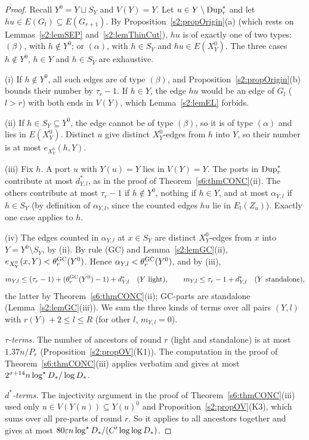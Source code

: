 \begin{proof}
Recall $Y^0=Y\sqcup S_Y$ and $V(Y)=Y$. Let $u\in Y\setminus\mathrm{Dup}^{*}_r$ and let $hu\in E(G_l)\subseteq E(G_{r+1})$. By Proposition~\ref{s2:propOrigin}(a) (which rests on Lemmas~\ref{s2:lemSEP} and~\ref{s2:lemThinCut}), $hu$ is of exactly one of two types: $(\beta)$, with $h\notin Y^0$; or $(\alpha)$, with $h\in S_Y$ and $hu\in E(X^0_Y)$. The three cases $h\notin Y^0$, $h\in Y$ and $h\in S_Y$ are exhaustive.

(i) If $h\notin Y^0$, all such edges are of type $(\beta)$, and Proposition~\ref{s2:propOrigin}(b) bounds their number by $\tau_r-1$. If $h\in Y$, the edge $hu$ would be an edge of $G_l$ ($l>r$) with both ends in $V(Y)$, which Lemma~\ref{s2:lemEL} forbids.

(ii) If $h\in S_Y\subseteq Y^0$, the edge cannot be of type $(\beta)$, so it is of type $(\alpha)$ and lies in $E(X^0_Y)$. Distinct $u$ give distinct $X^0_Y$-edges from $h$ into $Y$, so their number is at most $e_{X^0_Y}(h,Y)$.

(iii) Fix $h$. A port $u$ with $Y(u)=Y$ lies in $V(Y)=Y$. The ports in $\mathrm{Dup}^{*}_r$ contribute at most $d^*_{Y,l}$, as in the proof of Theorem~\ref{s6:thmCONC}(ii). The others contribute at most $\tau_r-1$ if $h\notin Y^0$, nothing if $h\in Y$, and at most $\alpha_{Y,l}$ if $h\in S_Y$ (by definition of $\alpha_{Y,l}$, since the counted edges $hu$ lie in $E_l(Z_u)$). Exactly one case applies to $h$.

(iv) The edges counted in $\alpha_{Y,l}$ at $x\in S_Y$ are distinct $X^0_Y$-edges from $x$ into $Y=Y^0\setminus S_Y$, by (ii). By rule (GC) and Lemma~\ref{s2:lemGC}(ii), $e_{X^0_Y}(x,Y)<\theta^{\mathrm{GC}}_r(Y^0)$. Hence $\alpha_{Y,l}<\theta^{\mathrm{GC}}_r(Y^0)$, and by (iii),
\[
m_{Y,l}\le(\tau_r-1)+(\theta^{\mathrm{GC}}_r(Y^0)-1)+d^*_{Y,l}\quad(Y\text{ light}),\qquad m_{Y,l}\le\tau_r-1+d^*_{Y,l}\quad(Y\text{ standalone}),
\]
the latter by Theorem~\ref{s6:thmCONC}(ii); GC-parts are standalone (Lemma~\ref{s2:lemGC}(iii)). We sum the three kinds of terms over all pairs $(Y,l)$ with $r(Y)+2\le l\le R$ (for other $l$, $m_{Y,l}=0$).

\emph{$\tau$-terms.} The number of ancestors of round $r$ (light and standalone) is at most $1.37n/P_r$ (Proposition~\ref{s2:propOV}(K1)). The computation in the proof of Theorem~\ref{s6:thmCONC}(iii) applies verbatim and gives at most $2^{\sigma+14}n\log^{\star}D_{*}/\log D_{*}$.

\emph{$d^*$-terms.} The injectivity argument in the proof of Theorem~\ref{s6:thmCONC}(iii) used only $u\in V(Y(u))\subseteq Y(u)^0$ and Proposition~\ref{s2:propOV}(K3), which sums over all pre-parts of round $r$. So it applies to all ancestors together and gives at most $80\varepsilon n\log^{\star}D_{*}/(C'\log\log D_{*})$.


\end{proof}
